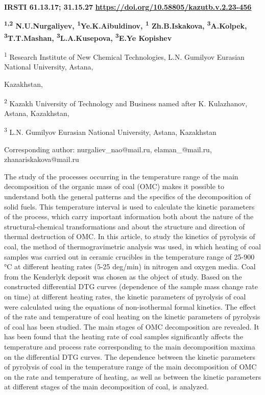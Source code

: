 \newpage
{\bfseries IRSTI 61.13.17; 31.15.27}
\hfill {\bfseries \href{https://doi.org/10.58805/kazutb.v.2.23-456}{https://doi.org/10.58805/kazutb.v.2.23-456}}


\begin{center}
    {\bfseries \textsuperscript{1,2} N.U.Nurgaliyev\envelope, \textsuperscript{1}Ye.K.Aibuldinov\envelope, \textsuperscript{1} Zh.B.Iskakova\envelope, \textsuperscript{3}A.Kolpek, \textsuperscript{3}T.T.Mashan, \textsuperscript{3}L.A.Kusepova, \textsuperscript{3}E.Ye Kopishev}

\textsuperscript{1} Research Institute of New Chemical Technologies,
L.N. Gumilyov Eurasian National University, Astana,

Kazakhstan,

\textsuperscript{2} Kazakh University of Technology and Business named
after K. Kulazhanov, Astana, Kazakhstan,

\textsuperscript{3} L.N. Gumilyov Eurasian National University, Astana,
Kazakhstan

\envelope Corresponding author: nurgaliev\_nao@mail.ru, elaman\_@mail.ru,
zhanariskakova@mail.ru
\end{center}

The study of the processes occurring in the temperature range of the
main decomposition of the organic mass of coal (OMC) makes it possible
to understand both the general patterns and the specifics of the
decomposition of solid fuels. This temperature interval is used to
calculate the kinetic parameters of the process, which carry important
information both about the nature of the structural-chemical
transformations and about the structure and direction of thermal
destruction of OMC. In this article, to study the kinetics of pyrolysis
of coal, the method of thermogravimetric analysis was used, in which
heating of coal samples was carried out in ceramic crucibles in the
temperature range of 25-900 °C at different heating rates (5-25 deg/min)
in nitrogen and oxygen media. Coal from the Kenderlyk deposit was chosen
as the object of study. Based on the constructed differential DTG curves
(dependence of the sample mass change rate on time) at different heating
rates, the kinetic parameters of pyrolysis of coal were calculated using
the equations of non-isothermal formal kinetics. The effect of the rate
and temperature of coal heating on the kinetic parameters of pyrolysis
of coal has been studied. The main stages of OMC decomposition are
revealed. It has been found that the heating rate of coal samples
significantly affects the temperature and process rate corresponding to
the main decomposition maxima on the differential DTG curves. The
dependence between the kinetic parameters of pyrolysis of coal in the
temperature range of the main decomposition of OMC on the rate and
temperature of heating, as well as between the kinetic parameters at
different stages of the main decomposition of coal, is analyzed.

